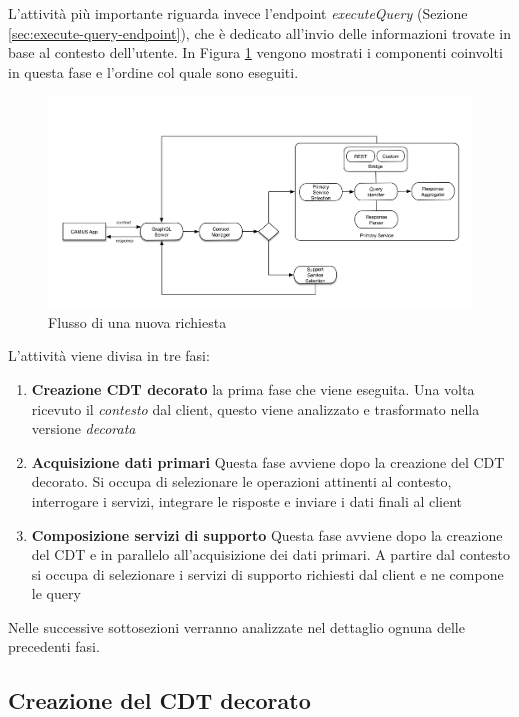 L'attività più importante riguarda invece l'endpoint \emph{executeQuery} (Sezione \ref{sec:execute-query-endpoint}), che è dedicato all'invio delle informazioni trovate in base al contesto dell'utente. In Figura \ref{fig:flusso-nuova-richiesta} vengono mostrati i componenti coinvolti in questa fase e l'ordine col quale sono eseguiti.

\begin{figure}[ht]
	\centering
	\includegraphics[width=\textwidth]{5-implementazione-backend/Immagini/flusso_richiesta.png}
	\caption{Flusso di una nuova richiesta\label{fig:flusso-nuova-richiesta}}
\end{figure}

L'attività viene divisa in tre fasi:

\begin{enumerate}
	\item \textbf{Creazione CDT decorato} \upe la prima fase che viene eseguita. Una volta ricevuto il \emph{contesto} dal client, questo viene analizzato e trasformato nella versione \emph{decorata}
	\item \textbf{Acquisizione dati primari} Questa fase avviene dopo la creazione del CDT decorato. Si occupa di selezionare le operazioni attinenti al contesto, interrogare i servizi, integrare le risposte e inviare i dati finali al client
	\item \textbf{Composizione servizi di supporto} Questa fase avviene dopo la creazione del CDT e in parallelo all'acquisizione dei dati primari. A partire dal contesto si occupa di selezionare i servizi di supporto richiesti dal client e ne compone le query
\end{enumerate}

Nelle successive sottosezioni verranno analizzate nel dettaglio ognuna delle precedenti fasi.

\subsection*{Creazione del CDT decorato}


